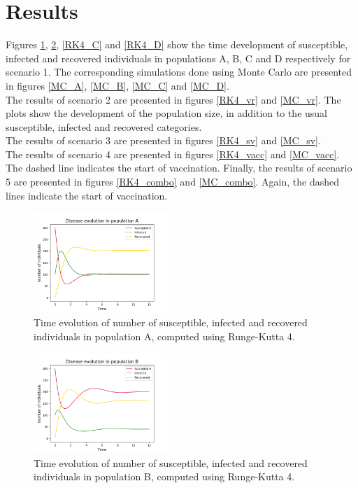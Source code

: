 \documentclass[notitlepage, reprint, nofootinbib]{revtex4-1}
\begin{document}
\section{Results}
Figures \ref{RK4_A}, \ref{RK4_B}, \ref{RK4_C} and \ref{RK4_D} show the time development of susceptible, infected and recovered individuals in populations A, B, C and D respectively for scenario 1. The corresponding simulations done using Monte Carlo are presented in figures \ref{MC_A}, \ref{MC_B}, \ref{MC_C} and \ref{MC_D}.\\[2mm]
The results of scenario 2 are presented in figures \ref{RK4_vr} and \ref{MC_vr}. The plots show the development of the population size, in addition to the usual susceptible, infected and recovered categories.\\[2mm]
The results of scenario 3 are presented in figures \ref{RK4_sv} and \ref{MC_sv}.\\[2mm]
The results of scenario 4 are presented in figures \ref{RK4_vacc} and \ref{MC_vacc}. The dashed line indicates the start of vaccination. 
Finally, the results of scenario 5 are presented in figures \ref{RK4_combo} and \ref{MC_combo}. Again, the dashed lines indicate the start of vaccination.
\begin{figure}[h!]
	\centering
	\includegraphics[width=0.45\textwidth]{../Figures/RK4_population_A}
	\caption{Time evolution of number of susceptible, infected and recovered individuals in population A, computed using Runge-Kutta 4.}
	\label{RK4_A}
\end{figure}
\begin{figure}[h!]
	\centering
	\includegraphics[width=0.45\textwidth]{../Figures/RK4_population_B}
	\caption{Time evolution of number of susceptible, infected and recovered individuals in population B, computed using Runge-Kutta 4.}
	\label{RK4_B}
\end{figure}
\end{document}
